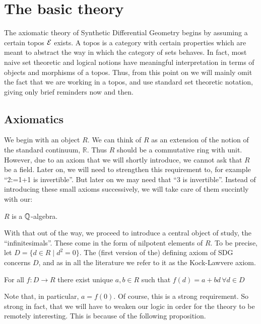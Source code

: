 \section{The basic theory}

The axiomatic theory of Synthetic Differential Geometry begins by assuming a certain topos \( \mathcal{E} \) exists. A topos is a category with certain properties which are meant to abstract the way in which the category of sets behaves. In fact, most naive set theoretic and logical notions have meaningful interpretation in terms of objects and morphisms of a topos. Thus, from this point on we will mainly omit the fact that we are working in a topos, and use standard set theoretic notation, giving only brief reminders now and then. 

\subsection{Axiomatics}

We begin with an object \( R \). We can think of \( R \) as an extension of the notion of the standard continuum, \( \mathbb{R} \). Thus \( R \) should be a commutative ring with unit. However, due to an axiom that we will shortly introduce, we cannot ask that \( R \) be a field. Later on, we will need to strengthen this requirement to, for example ``2:=1+1 is invertible''. But later on we may need that ``3 is invertible''. Instead of introducing these small axioms successively, we will take care of them succintly with our:

\begin{axiom}
  \label{ax0}
  \( R \) is a \( \mathbb{Q} \)-algebra.
\end{axiom}

With that out of the way, we proceed to introduce a central object of study, the ``infinitesimals''. These come in the form of nilpotent elements of \( R \). To be precise, let \( D = \{d\in R \mid d^2=0\} \). The (first version of the) defining axiom of SDG concerns \( D \), and as in all the literature we refer to it as the Kock-Lawvere axiom.

\begin{klaxiom}
  \label{KL1}
  For all \( f:D\to R \) there exist unique \( a,b\in R \) such that \( f(d) = a + bd\,\forall d\in D \)
\end{klaxiom}

Note that, in particular, \( a=f(0) \). Of course, this is a strong requirement. So strong in fact, that we will have to weaken our logic in order for the theory to be remotely interesting. This is because of the following proposition.

